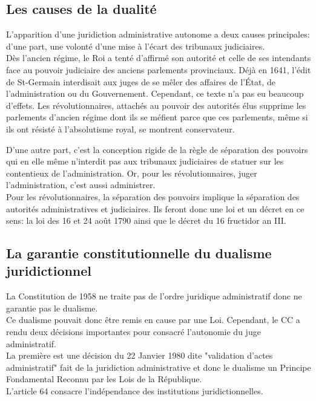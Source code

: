 \documentclass[12pt, a4paper, openany]{book}
\begin{document}
\subsection{Les causes de la dualité}

L'apparition d'une juridiction administrative autonome a deux causes principales: d'une part, une volonté d'une mise à l'écart des tribunaux judiciaires. \\
Dès l'ancien régime, le Roi a tenté d'affirmé son autorité et celle de ses intendants face au pouvoir judiciaire des anciens parlements provinciaux. Déjà en 1641, l'édit de St-Germain interdisait aux juges de se mêler des affaires de l'État, de l'administration ou du Gouvernement. Cependant, ce texte n'a pas eu beaucoup d'effets. Les révolutionnaires, attachés au pouvoir des autorités élus supprime les parlements d'ancien régime dont ils se méfient parce que ces parlements, même si ils ont résisté à l'absolutisme royal, se montrent conservateur.


D'une autre part, c'est la conception rigide de la règle de séparation des pouvoirs qui en elle même n'interdit pas aux tribunaux judiciaires de statuer sur les contentieux de l'administration. Or, pour les révolutionnaires, juger l'administration, c'est aussi administrer. \\
Pour les révolutionnaires, la séparation des pouvoirs implique la séparation des autorités administratives et judiciaires. Ils feront donc une loi et un décret en ce sens: la loi des 16 et 24 août 1790 ainsi que le décret du 16 fructidor an III. 


\subsection{La garantie constitutionnelle du dualisme juridictionnel}

La Constitution de 1958 ne traite pas de l'ordre juridique administratif donc ne garantie pas le dualisme. \\
Ce dualisme pouvait donc être remis en cause par une Loi. Cependant, le CC a rendu deux décisions importantes pour consacré l'autonomie du juge administratif. \\
La première est une décision du 22 Janvier 1980 dite "validation d'actes administratif" fait de la juridiction administrative et donc le dualisme un Principe Fondamental Reconnu par les Lois de la République. \\
L'article 64 consacre l'indépendance des institutions juridictionnelles. 
\end{document}
